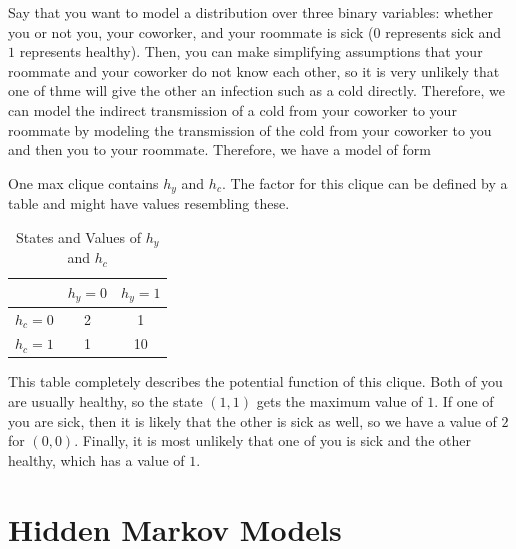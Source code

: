\documentclass{article}
\begin{document}
  \begin{example} 
    Say that you want to model a distribution over three binary variables: whether you or not you, your coworker, and your roommate is sick ($0$ represents sick and $1$ represents healthy). Then, you can make simplifying assumptions that your roommate and your coworker do not know each other, so it is very unlikely that one of thme will give the other an infection such as a cold directly. Therefore, we can model the indirect transmission of a cold from your coworker to your roommate by modeling the transmission of the cold from your coworker to you and then you to your roommate. Therefore, we have a model of form

    \begin{center}
    \end{center}
    One max clique contains $h_y$ and $h_c$. The factor for this clique can be defined by a table and might have values resembling these. 

    \begin{table}[H]
      \centering
      \begin{tabular}{c|c|c|}
      \cline{2-3}
      & \( h_y = 0 \) & \( h_y = 1 \) \\ \hline
      \multicolumn{1}{|c|}{\( h_c = 0 \)} & 2 & 1 \\ \hline
      \multicolumn{1}{|c|}{\( h_c = 1 \)} & 1 & 10 \\ \hline
      \end{tabular}
      \caption{States and Values of \( h_y \) and \( h_c \)}
    \end{table}

    This table completely describes the potential function of this clique. Both of you are usually healthy, so the state $(1, 1)$ gets the maximum value of $1$. If one of you are sick, then it is likely that the other is sick as well, so we have a value of $2$ for $(0, 0)$. Finally, it is most unlikely that one of you is sick and the other healthy, which has a value of $1$. 
  \end{example}

\section{Hidden Markov Models}
\end{document}
